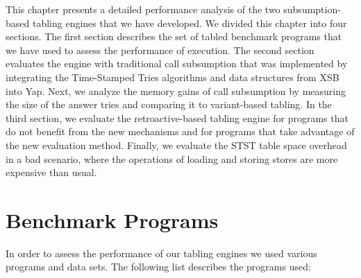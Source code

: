 This chapter presents a detailed performance analysis of the two subsumption-based tabling engines
that we have developed. We divided this chapter into four sections. The first section describes the
set of tabled benchmark programs that we have used to assess the performance of execution. The second
section evaluates the engine with traditional call subsumption that was implemented by integrating the
Time-Stamped Tries algorithms and data structures from XSB into Yap. Next, we analyze the memory gains
of call subsumption by measuring the size of the answer tries and comparing it to variant-based tabling.
In the third section, we evaluate the retroactive-based tabling engine for programs that do not benefit
from the new mechanisms and
for programs that take advantage of the new evaluation method. Finally, we evaluate the STST table space
overhead in a bad scenario, where the operations of loading and storing stores are more expensive than
usual.

\section{Benchmark Programs}

In order to assess the performance of our tabling engines we used various programs and data sets.
The following list describes the programs used:

